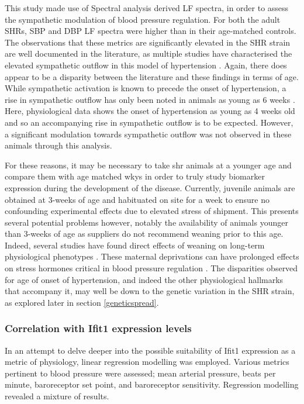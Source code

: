 This study made use of Spectral analysis derived LF spectra, in order to assess the sympathetic modulation of blood pressure regulation. For both the adult SHRs, SBP and DBP LF spectra were higher than in their age-matched controls. The observations that these metrics are significantly elevated in the SHR strain are well documented in the literature, as multiple studies have characterised the elevated sympathetic outflow in this model of hypertension \cite{Chopra2011,Akselrod1981}. Again, there does appear to be a disparity between the literature and these findings in terms of age. While sympathetic activation is known to precede the onset of hypertension, a rise in sympathetic outflow has only been noted in animals as young as 6 weeks \cite{doi:10.1046/j.1440-1681.2003.03852.x}. Here, physiological data shows the onset of hypertension as young as 4 weeks old and so an accompanying rise in sympathetic outflow is to be expected. However, a significant modulation towards sympathetic outflow was not observed in these animals through this analysis.  

For these reasons, it may be necessary to take \acrshort{shr} animals at a younger age and compare them with age matched \acrshort{wky}s in order to truly study biomarker expression during the development of the disease. Currently, juvenile animals are obtained at 3-weeks of age and habituated on site for a week to ensure no confounding experimental effects due to elevated stress of shipment. This presents several potential problems however, notably the availability of animals younger than 3-weeks of age as suppliers do not recommend weaning prior to this age. Indeed, several studies have found direct effects of weaning on long-term physiological phenotypes \cite{PRYCE200357}. These maternal deprivations can have prolonged effects on stress hormones critical in blood pressure regulation \cite{doi:10.1002/dev.420240803,Mangos2000}. The disparities observed for age of onset of hypertension, and indeed the other physiological hallmarks that accompany it, may well be down to the genetic variation in the SHR strain, as explored later in section \ref{geneticspread}.


\subsubsection{Correlation with Ifit1 expression levels}

In an attempt to delve deeper into the possible suitability of Ifit1 expression as a metric of physiology, linear regression modelling was employed. Various metrics pertinent to blood pressure were assessed; mean arterial pressure, beats per minute, baroreceptor set point, and baroreceptor sensitivity. Regression modelling revealed a mixture of results.

